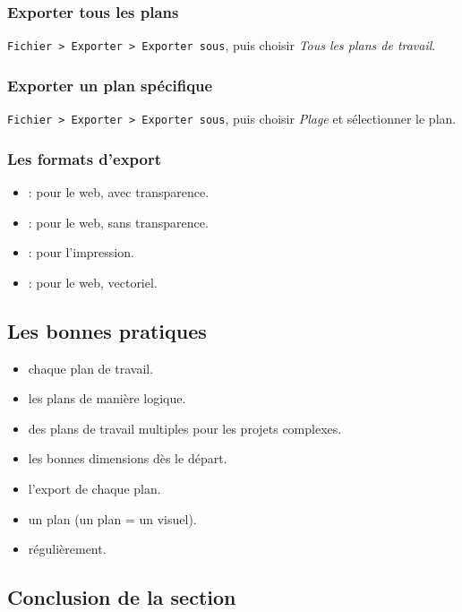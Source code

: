 \subsubsection{Exporter tous les plans}

\texttt{Fichier > Exporter > Exporter sous}, puis choisir \emph{Tous les plans de travail}.

\subsubsection{Exporter un plan spécifique}

\texttt{Fichier > Exporter > Exporter sous}, puis choisir \emph{Plage} et sélectionner le plan.

\subsubsection{Les formats d'export}

\begin{itemize}
    \item {} : pour le web, avec transparence.
    \item {} : pour le web, sans transparence.
    \item {} : pour l'impression.
    \item {} : pour le web, vectoriel.
\end{itemize}

\subsection{Les bonnes pratiques}

\begin{itemize}
    \item {} chaque plan de travail.
    \item {} les plans de manière logique.
    \item {} des plans de travail multiples pour les projets complexes.
    \item {} les bonnes dimensions dès le départ.
    \item {} l'export de chaque plan.
    \item {} un plan (un plan = un visuel).
    \item {} régulièrement.
\end{itemize}

\subsection*{Conclusion de la section}

